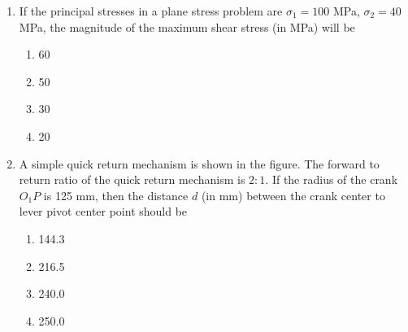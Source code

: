 \documentclass[journal]{IEEEtran}
\begin{document}
\begin{enumerate}
    

    \begin{multicols}{4}
    \begin{enumerate}
        \item 176.2
        \item 196.0
        \item 481.0
        \item 981.0
    \end{enumerate}
    \end{multicols}

    \item If the principal stresses in a plane stress problem are $\sigma_1 = 100$ MPa,
    $\sigma_2 = 40$ MPa, the magnitude of the maximum shear stress (in MPa) will be
    \begin{multicols}{4}
    \begin{enumerate}
        \item 60
        \item 50
        \item 30
        \item 20
    \end{enumerate}
    \end{multicols}

    \item A simple quick return mechanism is shown in the figure. The forward to return
    ratio of the quick return mechanism is $2:1$. If the radius of the crank $O_1P$ is
    125 mm, then the distance $d$ (in mm) between the crank center to lever pivot center
    point should be

    

    \begin{multicols}{4}
    \begin{enumerate}
        \item 144.3
        \item 216.5
        \item 240.0
        \item 250.0
    \end{enumerate}
    \end{multicols}
\end{enumerate}
\end{document}
